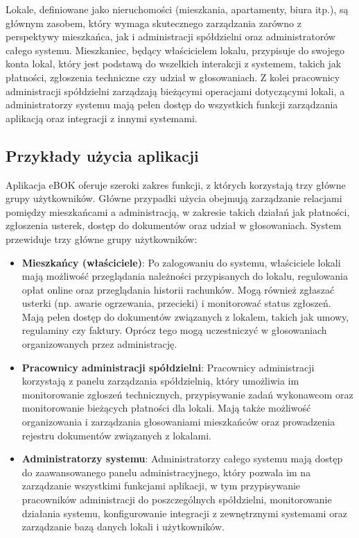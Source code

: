 Lokale, definiowane jako nieruchomości (mieszkania, apartamenty, biura itp.), są głównym zasobem, który wymaga skutecznego zarządzania zarówno z perspektywy mieszkańca, jak i administracji spółdzielni oraz administratorów całego systemu. Mieszkaniec, będący właścicielem lokalu, przypisuje do swojego konta lokal, który jest podstawą do wszelkich interakcji z systemem, takich jak płatności, zgłoszenia techniczne czy udział w głosowaniach. Z kolei pracownicy administracji spółdzielni zarządzają bieżącymi operacjami dotyczącymi lokali, a administratorzy systemu mają pełen dostęp do wszystkich funkcji zarządzania aplikacją oraz integracji z innymi systemami.

\subsection{Przykłady użycia aplikacji}

Aplikacja eBOK oferuje szeroki zakres funkcji, z których korzystają trzy główne grupy użytkowników. Główne przypadki użycia obejmują zarządzanie relacjami pomiędzy mieszkańcami a administracją, w zakresie takich działań jak płatności, zgłoszenia usterek, dostęp do dokumentów oraz udział w głosowaniach. System przewiduje trzy główne grupy użytkowników:

\begin{itemize} 

	\item \textbf{Mieszkańcy (właściciele)}: Po zalogowaniu do systemu, właściciele lokali mają możliwość przeglądania należności przypisanych do lokalu, regulowania opłat online oraz przeglądania historii rachunków. Mogą również zgłaszać usterki (np. awarie ogrzewania, przecieki) i monitorować status zgłoszeń. Mają pełen dostęp do dokumentów związanych z lokalem, takich jak umowy, regulaminy czy faktury. Oprócz tego mogą uczestniczyć w głosowaniach organizowanych przez administrację.
	
	\item \textbf{Pracownicy administracji spółdzielni}: Pracownicy administracji korzystają z panelu zarządzania spółdzielnią, który umożliwia im monitorowanie zgłoszeń technicznych, przypisywanie zadań wykonawcom oraz monitorowanie bieżących płatności dla lokali. Mają także możliwość organizowania i zarządzania głosowaniami mieszkańców oraz prowadzenia rejestru dokumentów związanych z lokalami.

	\item \textbf{Administratorzy systemu}: Administratorzy całego systemu mają dostęp do zaawansowanego panelu administracyjnego, który pozwala im na zarządzanie wszystkimi funkcjami aplikacji, w tym przypisywanie pracowników administracji do poszczególnych spółdzielni, monitorowanie działania systemu, konfigurowanie integracji z zewnętrznymi systemami oraz zarządzanie bazą danych lokali i użytkowników.

\end{itemize}


